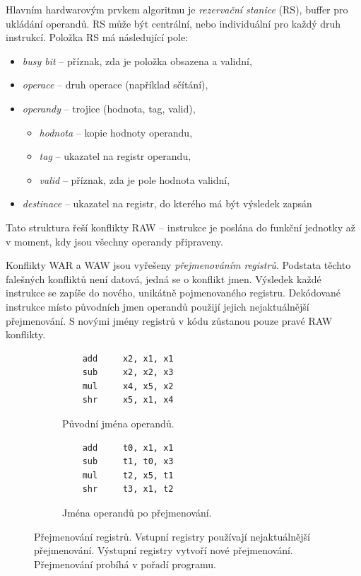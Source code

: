 Hlavním hardwarovým prvkem algoritmu je \emph{rezervační stanice} (RS), buffer pro ukládání operandů.
RS může být centrální, nebo individuální pro každý druh instrukcí.
Položka RS má následující pole:
\begin{itemize}
    \item \emph{busy bit}  -- příznak, zda je položka obsazena a validní,
    \item \emph{operace}   -- druh operace (například sčítání),
    \item \emph{operandy}  -- trojice (hodnota, tag, valid),
    \begin{itemize}
        \item \emph{hodnota} -- kopie hodnoty operandu,
        \item \emph{tag}     -- ukazatel na registr operandu,
        \item \emph{valid}   -- příznak, zda je pole hodnota validní,
    \end{itemize}
    \item \emph{destinace} -- ukazatel na registr, do kterého má být výsledek zapsán
\end{itemize}
Tato struktura řeší konflikty RAW -- instrukce je poslána do funkční jednotky až v moment, kdy jsou všechny operandy připraveny.

Konflikty WAR a WAW jsou vyřešeny \emph{přejmenováním registrů}.
Podstata těchto falešných konfliktů není datová, jedná se o konflikt jmen.
Výsledek každé instrukce se zapíše do nového, unikátně pojmenovaného registru.
Dekódované instrukce místo původních jmen operandů použijí jejich nejaktuálnější přejmenování.
S novými jmény registrů v kódu zůstanou pouze pravé RAW konflikty.

\begin{figure}[ht]
     \centering
     \begin{subfigure}[b]{0.4\textwidth}
         \centering
         \begin{lstlisting}
    add     x2, x1, x1 
    sub     x2, x2, x3 
    mul     x4, x5, x2 
    shr     x5, x1, x4 
\end{lstlisting}
         \caption{Původní jména operandů.}
         \label{fig:renaming1}
     \end{subfigure}
     \hfill
     \begin{subfigure}[b]{0.4\textwidth}
         \centering
         \begin{lstlisting}
    add     t0, x1, x1 
    sub     t1, t0, x3 
    mul     t2, x5, t1 
    shr     t3, x1, t2 
\end{lstlisting}
         \caption{Jména operandů po přejmenování.}
         \label{fig:renaming2}
     \end{subfigure}
        \caption{Přejmenování registrů. Vstupní registry používají nejaktuálnější přejmenování. Výstupní registry vytvoří nové přejmenování. Přejmenování probíhá v pořadí programu.}
        \label{fig:renaming}
\end{figure}

